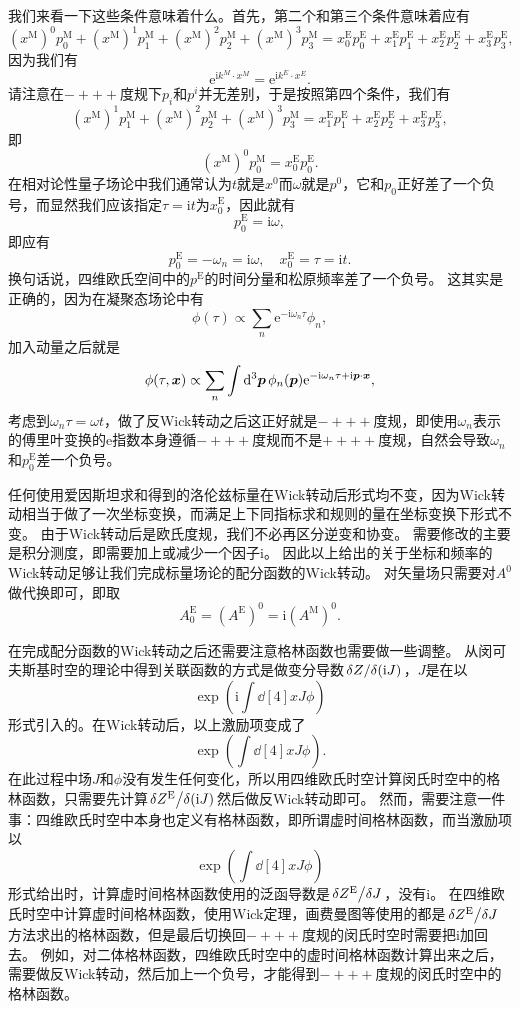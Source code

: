 \documentclass[hyperref, UTF8, a4paper]{ctexart}
\newcommand*{\ii}{\mathrm{i}}
\newcommand*{\ee}{\mathrm{e}}
\begin{document}
我们来看一下这些条件意味着什么。首先，第二个和第三个条件意味着应有
\[
    (x^\text{M})^0 p^\text{M}_0 + (x^\text{M})^1 p^\text{M}_1 + (x^\text{M})^2 p^\text{M}_2 + (x^\text{M})^3 p^\text{M}_3 = x^\text{E}_0 p^\text{E}_0 + x^\text{E}_1 p^\text{E}_1 + x^\text{E}_2 p^\text{E}_2 + x^\text{E}_3 p^\text{E}_3,
\]
因为我们有
\[
    \ee^{\ii k^M \cdot x^M} = \ee^{\ii k^E \cdot x^E}.
\]
请注意在$-+++$度规下$p_i$和$p^i$并无差别，于是按照第四个条件，我们有
\[
    (x^\text{M})^1 p^\text{M}_1 + (x^\text{M})^2 p^\text{M}_2 + (x^\text{M})^3 p^\text{M}_3 = x^\text{E}_1 p^\text{E}_1 + x^\text{E}_2 p^\text{E}_2 + x^\text{E}_3 p^\text{E}_3,
\]
即
\[
    (x^\text{M})^0 p^\text{M}_0 = x^\text{E}_0 p^\text{E}_0.
\]
在相对论性量子场论中我们通常认为$t$就是$x^0$而$\omega$就是$p^0$，它和$p_0$正好差了一个负号，而显然我们应该指定$\tau=\ii t$为$x^\text{E}_0$，因此就有
\[
    p_0^\text{E} = \ii \omega,
\]
即应有
\begin{equation}
    p_0^\text{E} = - \omega_n = \ii \omega, \quad x^\text{E}_0 = \tau = \ii t.
\end{equation}
换句话说，四维欧氏空间中的$p^\text{E}$的时间分量和松原频率差了一个负号。
这其实是正确的，因为在凝聚态场论中有
\[
    \phi(\tau) \propto \sum_n \ee^{-\ii \omega_n \tau} \phi_n,
\]
加入动量之后就是
\[
    \phi(\tau, \vb*{x}) \propto \sum_n \int \dd[3]{\vb*{p}} \phi_n(\vb*{p}) \ee^{-\ii \omega_n \tau + \ii \vb*{p} \cdot \vb*{x}} , 
\]
考虑到$\omega_n \tau = \omega t$，做了反Wick转动之后这正好就是$-+++$度规，即使用$\omega_n$表示的傅里叶变换的$\ee$指数本身遵循$-+++$度规而不是$++++$度规，自然会导致$\omega_n$和$p^\text{E}_0$差一个负号。

任何使用爱因斯坦求和得到的洛伦兹标量在Wick转动后形式均不变，因为Wick转动相当于做了一次坐标变换，而满足上下同指标求和规则的量在坐标变换下形式不变。
由于Wick转动后是欧氏度规，我们不必再区分逆变和协变。
需要修改的主要是积分测度，即需要加上或减少一个因子$\ii$。
因此以上给出的关于坐标和频率的Wick转动足够让我们完成标量场论的配分函数的Wick转动。
对矢量场只需要对$A^0$做代换即可，即取
\begin{equation}
    A^\text{E}_0 = (A^\text{E})^0 = \ii (A^\text{M})^0.
\end{equation}

在完成配分函数的Wick转动之后还需要注意格林函数也需要做一些调整。
从闵可夫斯基时空的理论中得到关联函数的方式是做变分导数$\fdv*{Z}{(\ii J)}$，$J$是在以
\[
    \exp(\ii \int \dd[4]{x} J \phi)
\]
形式引入的。在Wick转动后，以上激励项变成了
\[
    \exp(\int \dd[4]{x} J \phi).
\]
在此过程中场$J$和$\phi$没有发生任何变化，所以用四维欧氏时空计算闵氏时空中的格林函数，只需要先计算$\fdv*{Z^\text{E}}{(\ii J)}$然后做反Wick转动即可。
然而，需要注意一件事：四维欧氏时空中本身也定义有格林函数，即所谓虚时间格林函数，而当激励项以
\[
    \exp(\int \dd[4]{x} J \phi)
\]
形式给出时，计算虚时间格林函数使用的泛函导数是$\fdv*{Z^\text{E}}{J}$，没有$\ii$。
在四维欧氏时空中计算虚时间格林函数，使用Wick定理，画费曼图等使用的都是$\fdv*{Z^\text{E}}{J}$方法求出的格林函数，但是最后切换回$-+++$度规的闵氏时空时需要把$\ii$加回去。
例如，对二体格林函数，四维欧氏时空中的虚时间格林函数计算出来之后，需要做反Wick转动，然后加上一个负号，才能得到$-+++$度规的闵氏时空中的格林函数。
\end{document}
